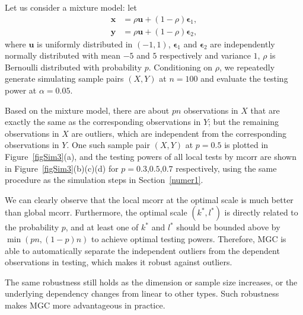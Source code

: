 \documentclass[11pt]{article}
\providecommand{\mb}[1]{\boldsymbol{#1}}
\begin{document}
Let us consider a mixture model: let 
\begin{align*}
\mb{x} &= \rho \mb{u} + (1-\rho) \mb{\epsilon}_{1}, \\
\mb{y} &= \rho \mb{u} + (1-\rho) \mb{\epsilon}_{2}, 
\end{align*}
where $\mb{u}$ is uniformly distributed in $(-1,1)$, $\mb{\epsilon}_{1}$ and $\mb{\epsilon}_{2}$ are independently normally distributed with mean $-5$ and $5$ respectively and variance $1$, $\rho$ is Bernoulli distributed with probability $p$. Conditioning on $\rho$, we repeatedly generate simulating sample pairs $(X,Y)$ at $n=100$ and evaluate the testing power at $\alpha=0.05$.

Based on the mixture model, there are about $pn$ observations in $X$ that are exactly the same as the corresponding observations in $Y$; but the remaining observations in $X$ are outliers, which are independent from the corresponding observations in $Y$. One such sample pair $(X,Y)$ at $p=0.5$ is plotted in Figure~\ref{figSim3}(a), and the testing powers of all local tests by mcorr are shown in Figure~\ref{figSim3}(b)(c)(d) for $p=0.3$,$0.5$,$0.7$ respectively, using the same procedure as the simulation steps in Section~\ref{numer1}.

We can clearly observe that the local mcorr at the optimal scale is much better than global mcorr. Furthermore, the optimal scale $(k^{*},l^{*})$ is directly related to the probability $p$, and at least one of $k^{*}$ and $l^{*}$ should be bounded above by $\min(pn,(1-p)n)$ to achieve optimal testing powers. Therefore, MGC is able to automatically separate the independent outliers from the dependent observations in testing, which makes it robust against outliers.

The same robustness still holds as the dimension or sample size increases, or the underlying dependency changes from linear to other types. Such robustness makes MGC more advantageous in practice. 
\end{document}

